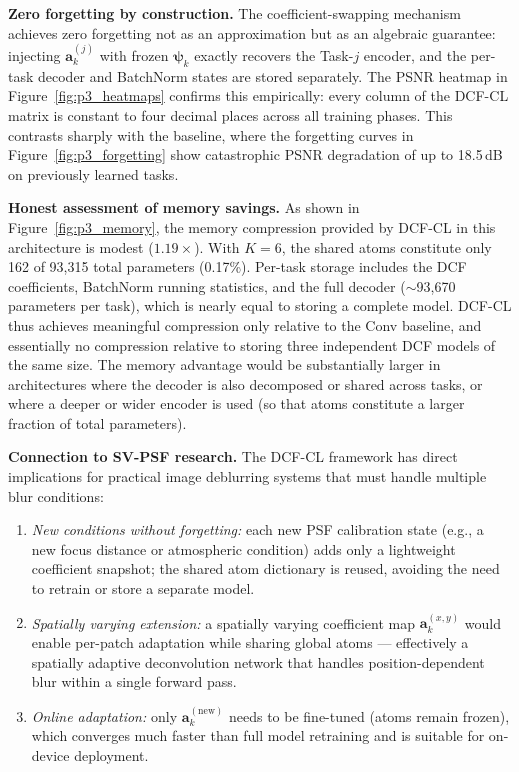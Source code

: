\documentclass[11pt,letterpaper]{article}
\newcommand{\avec}{\mathbf{a}}
\newcommand{\psivec}{\boldsymbol{\psi}}
\begin{document}
\textbf{Zero forgetting by construction.}
The coefficient-swapping mechanism achieves zero forgetting not as an
approximation but as an algebraic guarantee: injecting $\avec_k^{(j)}$
with frozen $\psivec_k$ exactly recovers the Task-$j$ encoder, and the
per-task decoder and BatchNorm states are stored separately.  The PSNR
heatmap in Figure~\ref{fig:p3_heatmaps} confirms this empirically: every
column of the DCF-CL matrix is constant to four decimal places across all
training phases.  This contrasts sharply with the baseline, where the
forgetting curves in Figure~\ref{fig:p3_forgetting} show catastrophic
PSNR degradation of up to 18.5\,dB on previously learned tasks.

\textbf{Honest assessment of memory savings.}
As shown in Figure~\ref{fig:p3_memory}, the memory compression provided
by DCF-CL in this architecture is modest ($1.19\times$).  With $K=6$,
the shared atoms constitute only 162 of 93{,}315 total parameters
(0.17\%).  Per-task storage includes the DCF coefficients, BatchNorm
running statistics, and the full decoder ($\sim$93{,}670 parameters
per task), which is nearly equal to storing a complete model.  DCF-CL
thus achieves meaningful compression only relative to the Conv baseline,
and essentially no compression relative to storing three independent DCF
models of the same size.  The memory advantage would be substantially
larger in architectures where the decoder is also decomposed or shared
across tasks, or where a deeper or wider encoder is used (so that atoms
constitute a larger fraction of total parameters).

\textbf{Connection to SV-PSF research.}
The DCF-CL framework has direct implications for practical image
deblurring systems that must handle multiple blur conditions:
\begin{enumerate}[leftmargin=*]
  \item \emph{New conditions without forgetting:} each new PSF calibration
        state (e.g., a new focus distance or atmospheric condition) adds
        only a lightweight coefficient snapshot; the shared atom dictionary
        is reused, avoiding the need to retrain or store a separate model.
  \item \emph{Spatially varying extension:} a spatially varying coefficient
        map $\avec_k^{(x,y)}$ would enable per-patch adaptation while
        sharing global atoms --- effectively a spatially adaptive
        deconvolution network that handles position-dependent blur within
        a single forward pass.
  \item \emph{Online adaptation:} only $\avec_k^{(\text{new})}$ needs to
        be fine-tuned (atoms remain frozen), which converges much faster
        than full model retraining and is suitable for on-device deployment.
\end{enumerate}
\end{document}
